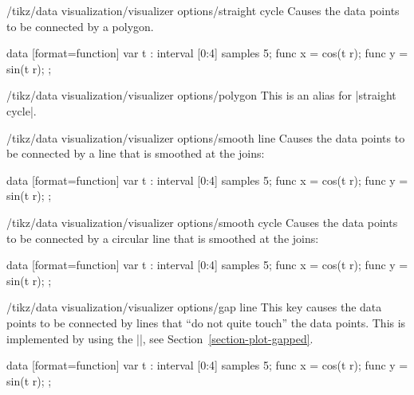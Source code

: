 \begin{key}{/tikz/data visualization/visualizer options/straight cycle}
    Causes the data points to be connected by a polygon.
\begin{codeexample}[preamble={\usetikzlibrary{datavisualization.formats.functions}}]
\tikz [scale=.55] \datavisualization
 [scientific axes=clean, all axes={ticks=few},
  visualize as smooth line=my data,  my data={straight cycle}]
data [format=function] {
  var t : interval [0:4] samples 5;
  func x = cos(\value t r);
  func y = sin(\value t r);
};
\end{codeexample}
\end{key}

\begin{key}{/tikz/data visualization/visualizer options/polygon}
    This is an alias for |straight cycle|.
\end{key}

\begin{key}{/tikz/data visualization/visualizer options/smooth line}
    Causes the data points to be connected by a line that is smoothed at the
    joins:
\begin{codeexample}[preamble={\usetikzlibrary{datavisualization.formats.functions}}]
\tikz [scale=.55] \datavisualization
 [scientific axes=clean, all axes={ticks=few},
  visualize as smooth line=my data,  my data={smooth line}]
data [format=function] {
  var t : interval [0:4] samples 5;
  func x = cos(\value t r);
  func y = sin(\value t r);
};
\end{codeexample}
\end{key}

\begin{key}{/tikz/data visualization/visualizer options/smooth cycle}
    Causes the data points to be connected by a circular line that is smoothed
    at the joins:
\begin{codeexample}[preamble={\usetikzlibrary{datavisualization.formats.functions}}]
\tikz [scale=.55] \datavisualization
 [scientific axes=clean, all axes={ticks=few},
  visualize as smooth line=my data,  my data={smooth cycle}]
data [format=function] {
  var t : interval [0:4] samples 5;
  func x = cos(\value t r);
  func y = sin(\value t r);
};
\end{codeexample}
\end{key}

\begin{key}{/tikz/data visualization/visualizer options/gap line}
    This key causes the data points to be connected by lines that ``do not
    quite touch'' the data points. This is implemented by using the
    |\pgfplothandlergaplineto|, see Section~\ref{section-plot-gapped}.
\begin{codeexample}[preamble={\usetikzlibrary{datavisualization.formats.functions}}]
\tikz [scale=.55] \datavisualization
 [scientific axes=clean, all axes={ticks=few},
  visualize as smooth line=my data,  my data={gap line}]
data [format=function] {
  var t : interval [0:4] samples 5;
  func x = cos(\value t r);
  func y = sin(\value t r);
};
\end{codeexample}
\end{key}


